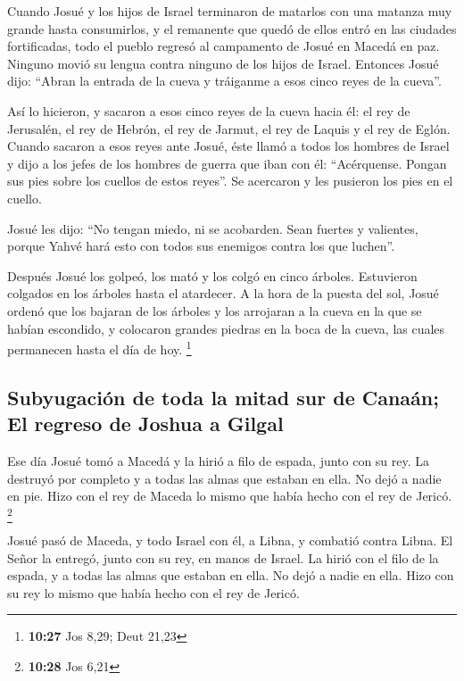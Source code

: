 \begin{paracol}{2}
 Cuando Josué y los hijos de Israel terminaron de
matarlos con una matanza muy grande hasta consumirlos, y el remanente
que quedó de ellos entró en las ciudades fortificadas, 
todo el pueblo regresó al campamento de Josué en Macedá en paz. Ninguno
movió su lengua contra ninguno de los hijos de Israel. 
Entonces Josué dijo: ``Abran la entrada de la cueva y tráiganme a esos
cinco reyes de la cueva''.

 Así lo hicieron, y sacaron a esos cinco reyes de la
cueva hacia él: el rey de Jerusalén, el rey de Hebrón, el rey de Jarmut,
el rey de Laquis y el rey de Eglón.  Cuando sacaron a
esos reyes ante Josué, éste llamó a todos los hombres de Israel y dijo a
los jefes de los hombres de guerra que iban con él: ``Acérquense. Pongan
sus pies sobre los cuellos de estos reyes''. Se acercaron y les pusieron
los pies en el cuello.

 Josué les dijo: ``No tengan miedo, ni se acobarden. Sean
fuertes y valientes, porque Yahvé hará esto con todos sus enemigos
contra los que luchen''.

 Después Josué los golpeó, los mató y los colgó en cinco
árboles. Estuvieron colgados en los árboles hasta el atardecer.
 A la hora de la puesta del sol, Josué ordenó que los
bajaran de los árboles y los arrojaran a la cueva en la que se habían
escondido, y colocaron grandes piedras en la boca de la cueva, las
cuales permanecen hasta el día de hoy. \footnote{\textbf{10:27} Jos
  8,29; Deut 21,23}

\hypertarget{subyugaciuxf3n-de-toda-la-mitad-sur-de-canauxe1n-el-regreso-de-joshua-a-gilgal}{%
\subsection{Subyugación de toda la mitad sur de Canaán; El regreso de
Joshua a
Gilgal}\label{subyugaciuxf3n-de-toda-la-mitad-sur-de-canauxe1n-el-regreso-de-joshua-a-gilgal}}

 Ese día Josué tomó a Macedá y la hirió a filo de espada,
junto con su rey. La destruyó por completo y a todas las almas que
estaban en ella. No dejó a nadie en pie. Hizo con el rey de Maceda lo
mismo que había hecho con el rey de Jericó. \footnote{\textbf{10:28} Jos
  6,21}

 Josué pasó de Maceda, y todo Israel con él, a Libna, y
combatió contra Libna.  El Señor la entregó, junto con su
rey, en manos de Israel. La hirió con el filo de la espada, y a todas
las almas que estaban en ella. No dejó a nadie en ella. Hizo con su rey
lo mismo que había hecho con el rey de Jericó.


\end{paracol}
